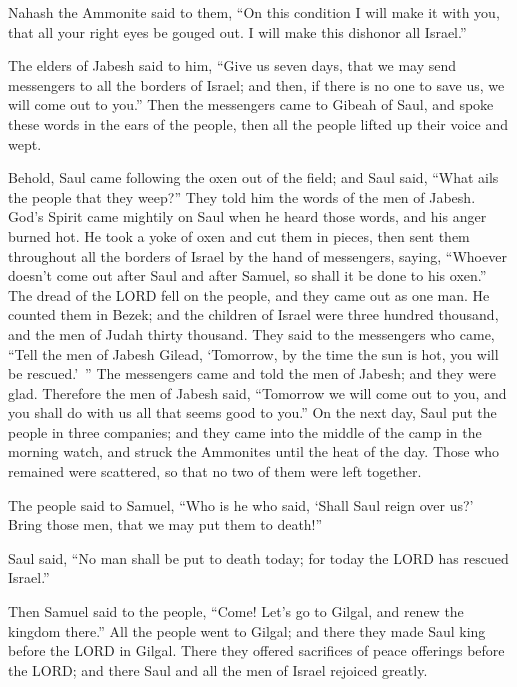 \myverse{}Nahash the Ammonite said to them, “On this condition I will make
it with you, that all your right eyes be gouged out. I will make this dishonor all Israel.”

\myverse{}The elders of Jabesh said to him, “Give us seven days, that we
may send messengers to all the borders of Israel; and then, if there is no one to save us, we will come
out to you.”
\myverse{}Then the messengers came to Gibeah of Saul, and spoke these words in the ears
of the people, then all the people lifted up their voice and wept.

\myverse{}Behold, Saul came following the oxen out of the field; and Saul
said, “What ails the people that they weep?” They told him the words of the men of Jabesh.
\myverse{}God’s Spirit came mightily on Saul when he heard those words, and his anger
burned hot.
\myverse{}He took a yoke of oxen and cut them in pieces, then sent them throughout all
the borders of Israel by the hand of messengers, saying, “Whoever doesn’t come out after Saul and after
Samuel, so shall it be done to his oxen.” The dread of the LORD fell on the people, and they came out
as one man.
\myverse{}He counted them in Bezek; and the children of Israel were three hundred thousand,
and the men of Judah thirty thousand.
\myverse{}They said to the messengers who came, “Tell the men of Jabesh Gilead, ‘Tomorrow,
by the time the sun is hot, you will be rescued.’ ” The messengers came and told the men of Jabesh; and
they were glad.
\myverse{}Therefore the men of Jabesh said, “Tomorrow we will come out to you, and
you shall do with us all that seems good to you.”
\myverse{}On the next day, Saul put the people in three companies; and they came into
the middle of the camp in the morning watch, and struck the Ammonites until the heat of the day. Those
who remained were scattered, so that no two of them were left together.

\myverse{}The people said to Samuel, “Who is he who said, ‘Shall Saul
reign over us?’ Bring those men, that we may put them to death!”

\myverse{}Saul said, “No man shall be put to death today; for today the
LORD has rescued Israel.”

\myverse{}Then Samuel said to the people, “Come! Let’s go to Gilgal, and
renew the kingdom there.”
\myverse{}All the people went to Gilgal; and there they made Saul king before the LORD
in Gilgal. There they offered sacrifices of peace offerings before the LORD; and there Saul and all the
men of Israel rejoiced greatly.


